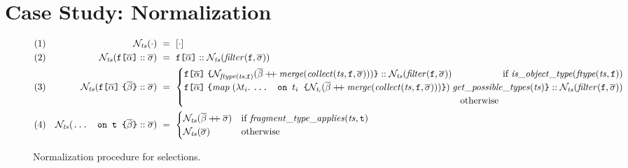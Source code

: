 \section{Case Study: Normalization}\label{sec:norm}

\begin{figure*}[t]
  \small
  \begin{flushright}
  \end{flushright}  
  \centering
  \vspace{-1ex}
    \begin{align*}
    &(1)& \tnorm{\cdot} &~=~ [\cdot] \\
    &(2)& \tnorm{\fld :: \sset} &~=~ 
       	\fld :: \tnorm{\filter{\sset}{\fkey}} \\      
    &(3)& \tnorm{\nfld{\overline{\beta}} :: \sset} &~=~
    \begin{cases}
        \nfld{\norm{\mathit{\ftype{ts}{\fkey}}}{\overline{\beta} \mdoubleplus \mathit{merge (\collect{ts}{\fkey}{\sset})}}} :: \tnorm{\filter{\sset}{\fkey}} \hfill \text{ if } 
	            \mathit{is\_object\_type (\ftype{ts}{\fkey})}\\
    \nfld{\mathit{map}\; (\lambda t_{i}.\; \ifrag{$t_{i}$}{\norm{t_{i}}{\overline{\beta} \mdoubleplus \mathit{merge (\collect{ts}{\fkey}{\sset})}}})\; \mathit{get\_possible\_types (ts)}} 
    		:: \tnorm{\filter{\sset}{\fkey}} \\
		\quad\quad\quad\quad\quad\quad\quad\quad\quad\quad\quad\quad\quad\quad\quad\quad\quad\quad\quad\quad\quad\quad\quad\quad\quad\quad\quad\quad\quad\; \text{ otherwise } 
    \end{cases}\\
    &(4)& \tnorm{\ifrag{t}{\overline{\beta}} :: \sset} &~=~ 
    \begin{cases}
    \tnorm{\overline{\beta} \mdoubleplus \sset} & 
    \text{if }\mathit{fragment\_type\_applies(ts, \texttt{t})}\\
    \tnorm{\sset} & \text{otherwise}
    \end{cases}
    \end{align*}
    \caption{Normalization procedure for \gql selections. 
    }
\label{fig:normalize}
\end{figure*}

